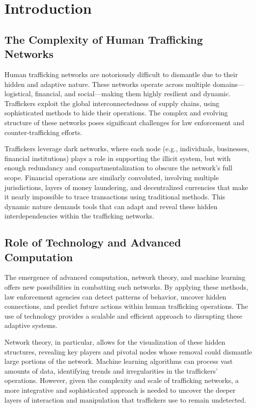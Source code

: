 \documentclass[%
 preprint, linenumbers,
 amsmath,amssymb,
 aps, physrev,
]{revtex4-2}
\begin{document}
\tableofcontents

\section{Introduction}

\subsection{The Complexity of Human Trafficking Networks} Human trafficking networks are notoriously difficult to dismantle due to their hidden and adaptive nature. These networks operate across multiple domains—logistical, financial, and social—making them highly resilient and dynamic. Traffickers exploit the global interconnectedness of supply chains, using sophisticated methods to hide their operations. The complex and evolving structure of these networks poses significant challenges for law enforcement and counter-trafficking efforts.

Traffickers leverage dark networks, where each node (e.g., individuals, businesses, financial institutions) plays a role in supporting the illicit system, but with enough redundancy and compartmentalization to obscure the network’s full scope. Financial operations are similarly convoluted, involving multiple jurisdictions, layers of money laundering, and decentralized currencies that make it nearly impossible to trace transactions using traditional methods. This dynamic nature demands tools that can adapt and reveal these hidden interdependencies within the trafficking networks.

\subsection{Role of Technology and Advanced Computation} The emergence of advanced computation, network theory, and machine learning offers new possibilities in combatting such networks. By applying these methods, law enforcement agencies can detect patterns of behavior, uncover hidden connections, and predict future actions within human trafficking operations. The use of technology provides a scalable and efficient approach to disrupting these adaptive systems.

Network theory, in particular, allows for the visualization of these hidden structures, revealing key players and pivotal nodes whose removal could dismantle large portions of the network. Machine learning algorithms can process vast amounts of data, identifying trends and irregularities in the traffickers' operations. However, given the complexity and scale of trafficking networks, a more integrative and sophisticated approach is needed to uncover the deeper layers of interaction and manipulation that traffickers use to remain undetected.
\end{document}
